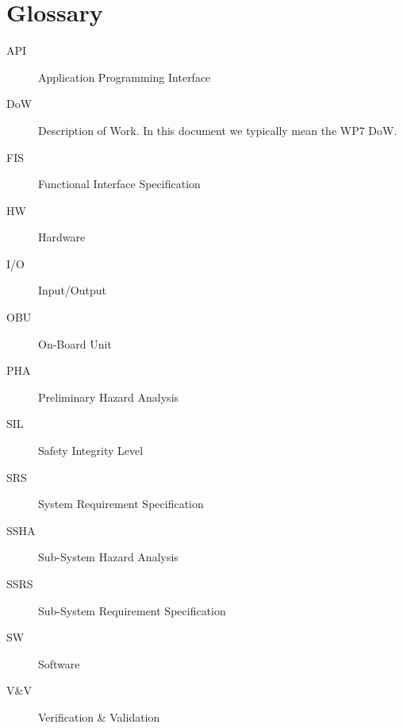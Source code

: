 








\section{Glossary}
\label{sec:glossary}

\begin{description}
\item[API] Application Programming Interface
\item[DoW] Description of Work.  In this document we typically mean the WP7 DoW.
\item[FIS] Functional Interface Specification
\item[HW] Hardware
\item[I/O] Input/Output
\item[OBU] On-Board Unit
\item[PHA] Preliminary Hazard Analysis
\item[SIL] Safety Integrity Level
\item[SRS] System Requirement Specification
\item[SSHA] Sub-System Hazard Analysis
\item[SSRS] Sub-System Requirement Specification
\item[SW] Software
\item[V\&V] Verification \& Validation
\end{description}



